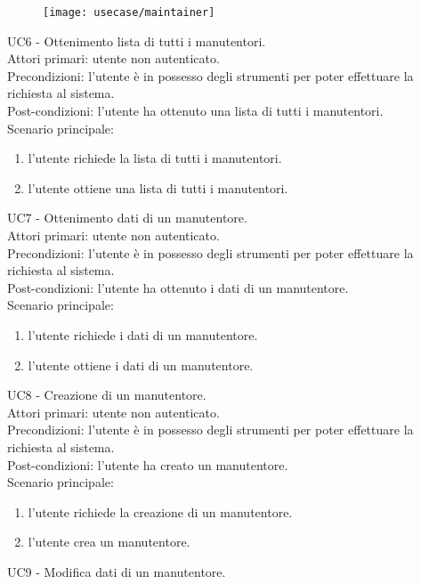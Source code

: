 \begin{figure}[!h]
    \centering
    \texttt{[image: usecase/maintainer]}
\end{figure}
UC6 - Ottenimento lista di tutti i manutentori.
\\
Attori primari: utente non autenticato.
\\
Precondizioni: l'utente è in possesso degli strumenti per poter effettuare la richiesta al sistema.
\\
Post-condizioni: l'utente ha ottenuto una lista di tutti i manutentori.
\\
Scenario principale:
\begin{enumerate}
    \item l'utente richiede la lista di tutti i manutentori.
    \item l'utente ottiene una lista di tutti i manutentori.
\end{enumerate}
\leavevmode\newline
UC7 - Ottenimento dati di un manutentore.
\\
Attori primari: utente non autenticato.
\\
Precondizioni: l'utente è in possesso degli strumenti per poter effettuare la richiesta al sistema.
\\
Post-condizioni: l'utente ha ottenuto i dati di un manutentore.
\\
Scenario principale:
\begin{enumerate}
    \item l'utente richiede i dati di un manutentore.
    \item l'utente ottiene i dati di un manutentore.
\end{enumerate}
\leavevmode\newline
UC8 - Creazione di un manutentore.
\\
Attori primari: utente non autenticato.
\\
Precondizioni: l'utente è in possesso degli strumenti per poter effettuare la richiesta al sistema.
\\
Post-condizioni: l'utente ha creato un manutentore.
\\
Scenario principale:
\begin{enumerate}
    \item l'utente richiede la creazione di un manutentore.
    \item l'utente crea un manutentore.
\end{enumerate}
\leavevmode\newline
UC9 - Modifica dati di un manutentore.
